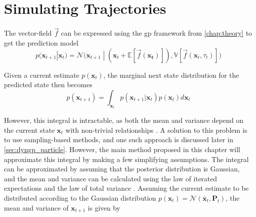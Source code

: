 \section{Simulating Trajectories}

The vector-field $\vec{f}$ can be expressed using the \acrshort{gp} framework from \cref{chap:theory} to get the prediction model
\begin{equation}\label{eq:dyngp_predictive_distribution}
    p(\boldsymbol{x}_{t+1} | \boldsymbol{x}_t) = \mathcal{N}\big(\boldsymbol{x}_{t+1} \; | \; (\boldsymbol{x}_t + \mathbb{E}[\vec{f}(\boldsymbol{x_t})]), \mathbb{V}[\vec{f}(\boldsymbol{x}_t, \tau_t)] \big)
\end{equation}

Given a current estimate $p(\boldsymbol{x}_t)$, the marginal next state distribution for the predicted state then becomes
\begin{equation}\label{eq:dyngp_true_posterior}
    p(\boldsymbol{x}_{t+1}) = \int_{\boldsymbol{x}_t} p(\boldsymbol{x}_{t+1} | \boldsymbol{x}_t) p(\boldsymbol{x}_t) d\boldsymbol{x}_t
\end{equation}

However, this integral is intractable, as both the mean and variance depend on the current state $\boldsymbol{x}_t$ with non-trivial relationships \cite{pedestrian,multistep_gp}. A solution to this problem is to use sampling-based methods, and one such approach is discussed later in \cref{sec:dyngp_particle}.
However, the main method proposed in this chapter will approximate this integral by making a few simplifying assumptions. The integral can be approximated by assuming that the posterior distribution is Gaussian, and the mean and variance can be calculated using the law of iterated expectations and the law of total variance \cite{multistep_gp}. Assuming the current estimate to be distributed according to the Gaussian distribution $p(\boldsymbol{x}_t) = \mathcal{N}(\bar{\boldsymbol{x}}_t, \boldsymbol{P}_t)$, the mean and variance of $\boldsymbol{x}_{t+1}$ is given by

